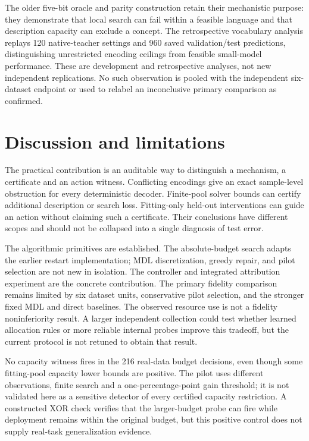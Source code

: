\documentclass[review,12pt]{elsarticle}
\begin{document}
The older five-bit oracle and parity construction retain their mechanistic purpose: they demonstrate that local search can fail within a feasible language and that description capacity can exclude a concept. The retrospective vocabulary analysis replays 120 native-teacher settings and 960 saved validation/test predictions, distinguishing unrestricted encoding ceilings from feasible small-model performance. These are development and retrospective analyses, not new independent replications. No such observation is pooled with the independent six-dataset endpoint or used to relabel an inconclusive primary comparison as confirmed.

\section{Discussion and limitations}
The practical contribution is an auditable way to distinguish a mechanism, a certificate and an action witness. Conflicting encodings give an exact sample-level obstruction for every deterministic decoder. Finite-pool solver bounds can certify additional description or search loss. Fitting-only held-out interventions can guide an action without claiming such a certificate. Their conclusions have different scopes and should not be collapsed into a single diagnosis of test error.

The algorithmic primitives are established. The absolute-budget search adapts the earlier restart implementation; MDL discretization, greedy repair, and pilot selection are not new in isolation. The controller and integrated attribution experiment are the concrete contribution. The primary fidelity comparison remains limited by six dataset units, conservative pilot selection, and the stronger fixed MDL and direct baselines. The observed resource use is not a fidelity noninferiority result. A larger independent collection could test whether learned allocation rules or more reliable internal probes improve this tradeoff, but the current protocol is not retuned to obtain that result.

No capacity witness fires in the 216 real-data budget decisions, even though some fitting-pool capacity lower bounds are positive. The pilot uses different observations, finite search and a one-percentage-point gain threshold; it is not validated here as a sensitive detector of every certified capacity restriction. A constructed XOR check verifies that the larger-budget probe can fire while deployment remains within the original budget, but this positive control does not supply real-task generalization evidence.
\end{document}
